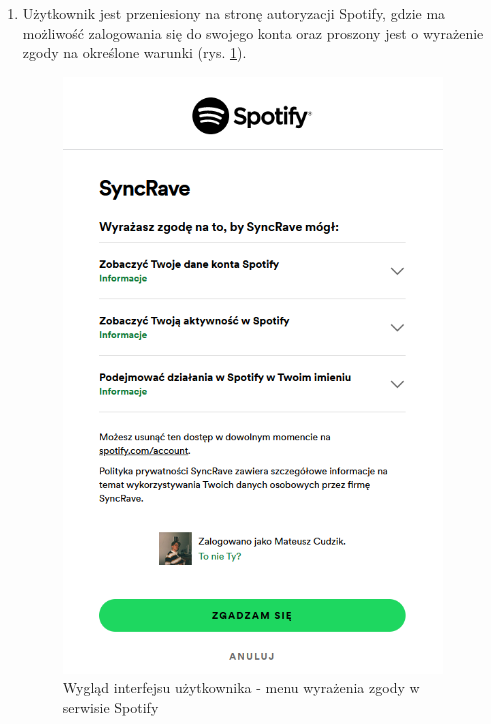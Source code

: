 \begin{enumerate}
\item Użytkownik jest przeniesiony na stronę autoryzacji Spotify, gdzie ma możliwość zalogowania się do swojego konta oraz proszony jest o wyrażenie zgody na określone warunki (rys. \ref{fig:spotify-menu}).
\begin{figure}[h]
\centering
\includegraphics[width=0.95\textwidth]{./graf/spotify_permission.PNG}
\caption{Wygląd interfejsu użytkownika - menu wyrażenia zgody w serwisie Spotify}
\label{fig:spotify-menu}
\end{figure}


\end{enumerate}
